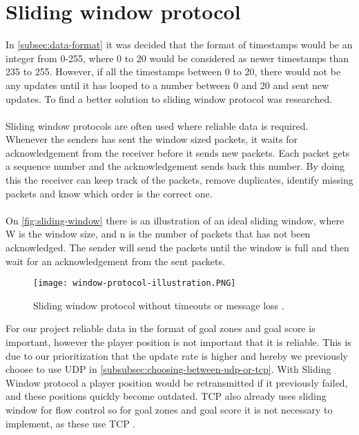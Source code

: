 \section{Sliding window protocol}
In \autoref{subsec:data-format} it was decided that the format of timestamps would be an integer from 0-255, where 0 to 20 would be considered as newer timestamps than 235 to 255.
However, if all the timestamps between 0 to 20, there would not be any updates until it has looped to a number between 0 and 20 and sent new updates.
To find a better solution to sliding window protocol was researched.
\\\\
Sliding window protocols are often used where reliable data is required.
Whenever the senders has sent the window sized packets, it waits for acknowledgement from the receiver before it sends new packets.
Each packet gets a sequence number and the acknowledgement sends back this number.
By doing this the receiver can keep track of the packets, remove duplicates, identify missing packets and know which order is the correct one.
\\\\
On \autoref{fig:sliding-window} there is an illustration of an ideal sliding window, where W is the window size, and n is the number of packets that has not been acknowledged.
The sender will send the packets until the window is full and then wait for an acknowledgement from the sent packets.
\begin{figure}[H]
    \centering
    \texttt{[image: window-protocol-illustration.PNG]}
    \caption{Sliding window protocol without timeouts or message loss \cite{design-and-validation-of-computer-protocols}.}
    \label{fig:sliding-window}
\end{figure}
\noindent
For our project reliable data in the format of goal zones and goal score is important, however the player position is not important that it is reliable.
This is due to our prioritization that the update rate is higher and hereby we previously choose to use UDP in \autoref{subsubsec:choosing-between-udp-or-tcp}.
With Sliding Window protocol a player position would be retransmitted if it previously failed, and these positions quickly become outdated.
TCP also already uses sliding window for flow control so for goal zones and goal score it is not necessary to implement, as these use TCP \cite{ibm:sliding-window}.
